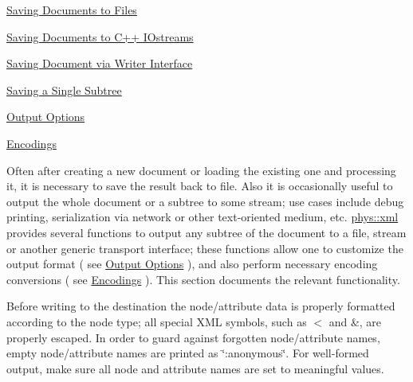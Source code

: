 \begin{DoxyItemize}
\item \hyperlink{XMLManual_XMLSavingFile}{Saving Documents to Files}
\item \hyperlink{XMLManual_XMLSavingStreams}{Saving Documents to C++ IOstreams}
\item \hyperlink{XMLManual_XMLSavingWriter}{Saving Document via Writer Interface}
\item \hyperlink{XMLManual_XMLSavingSubtree}{Saving a Single Subtree}
\item \hyperlink{XMLManual_XMLSavingOptions}{Output Options}
\item \hyperlink{XMLManual_XMLSavingEncodings}{Encodings}
\end{DoxyItemize}

Often after creating a new document or loading the existing one and processing it, it is necessary to save the result back to file. Also it is occasionally useful to output the whole document or a subtree to some stream; use cases include debug printing, serialization via network or other text-\/oriented medium, etc. \hyperlink{namespacephys_1_1xml}{phys::xml} provides several functions to output any subtree of the document to a file, stream or another generic transport interface; these functions allow one to customize the output format ( see \hyperlink{XMLManual_XMLSavingOptions}{Output Options} ), and also perform necessary encoding conversions ( see \hyperlink{XMLManual_XMLSavingEncodings}{Encodings} ). This section documents the relevant functionality. \par
 \par
 Before writing to the destination the node/attribute data is properly formatted according to the node type; all special XML symbols, such as $<$ and \&, are properly escaped. In order to guard against forgotten node/attribute names, empty node/attribute names are printed as \char`\"{}:anonymous\char`\"{}. For well-\/formed output, make sure all node and attribute names are set to meaningful values. \par
 \par
